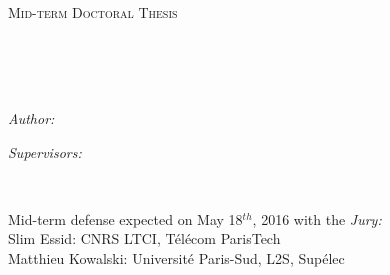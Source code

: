 
\begin{titlepage}
\begin{center}

\vspace*{0.05\textheight}
\textsc{\LARGE \univname}\\[1.cm] %
\textsc{\Large Mid-term Doctoral Thesis}\\[0.5cm] %

\vspace{1.cm}

\HRule \\[0.4cm] %
{\huge \bfseries \ttitle}\\[0.4cm] %
\HRule \\[1.5cm] %
 
\begin{minipage}{0.4\textwidth}
\begin{flushleft} \Large
\emph{Author:}\\
{\authorname} %
\end{flushleft}
\end{minipage}
\begin{minipage}{0.4\textwidth}
\begin{flushright} \Large
\emph{Supervisors:}\\%
{\supname} %
\end{flushright}
\end{minipage}\\[2cm]

\begin{minipage}{0.8\textwidth}
\begin{center} \large
Mid-term defense expected on May 18$^{th}$, 2016 with the \emph{Jury:}\\ \vspace{0.4cm}
Slim Essid: CNRS LTCI, T\'el\'ecom ParisTech\\ \vspace{0.2cm}
Matthieu Kowalski: Universit\'e Paris-Sud, L2S, Supélec\\ \vspace{2.cm}


\end{center}
\end{minipage}
\end{center}
\end{titlepage}
